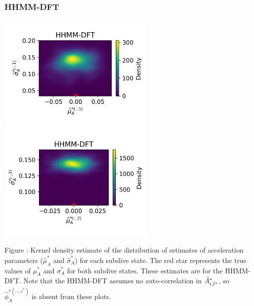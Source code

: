 \documentclass{article}
\begin{document}
        \subsubsection{HHMM-DFT}
        \begin{center}
        \includegraphics[width=3in]{../Plots/hhmm_FV_uncorr_MLE_density_A_0_0.png}
        \includegraphics[width=3in]{../Plots/hhmm_FV_uncorr_MLE_density_A_0_1.png}
        \end{center}
        
        \noindent Figure : Kernel density estimate of the distribution of estimates of acceleration parameters ($\hat \mu^*_A$ and $\hat \sigma^*_A$) for each subdive state. The red star represents the true values of $\mu^*_A$ and $\sigma^*_A$ for both subdive states. These estimates are for the HHMM-DFT. Note that the HHMM-DFT assumes no auto-correlation in $\tilde{A}^*_{t,\tilde t^*}$, so $\hat \phi_A^{*(\cdots,i^*)}$ is absent from these plots.
        \addtocounter{fignum}{1}
        
\end{document}
